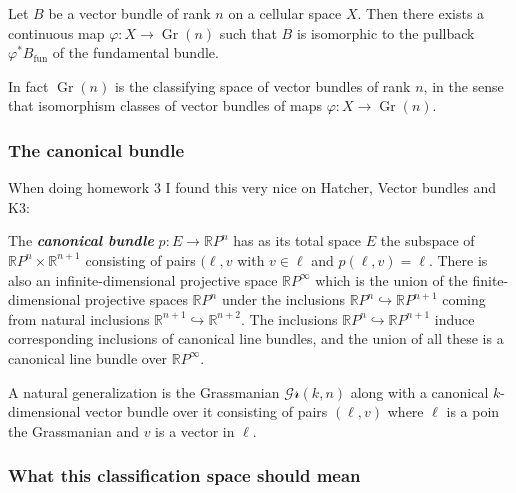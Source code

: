 \begin{thm}\leavevmode
	Let $B$ be a vector bundle of rank $n$ on a cellular space $X$. Then there exists a continuous map $\varphi:X\to \operatorname{Gr}(n)$ such that $ B$ is isomorphic to the pullback $\varphi^*B_{\operatorname{fun}}$ of the fundamental bundle.
\end{thm}

\begin{remark}
	In fact $\operatorname{Gr}(n)$ is the classifying space of vector bundles of rank $n$, in the sense that isomorphism classes of vector bundles of maps $\varphi:X\to \operatorname{Gr}(n)$.
\end{remark}

\subsubsection{The canonical bundle}

When doing homework 3 I found this very nice on Hatcher, Vector bundles and K3:

\begin{defn}
	The \textit{\textbf{canonical bundle}} $p:E\to \mathbb{R}P^{n}$ has as its total space $E$ the subspace of $\mathbb{R}P^{n}\times \mathbb{R}^{n+1}$ consisting of pairs $(\ell,v$ with $v\in\ell$ and $p(\ell,v)=\ell$. There is also an infinite-dimensional projective space $\mathbb{R}P^{\infty}$ which is the union of the finite-dimensional projective spaces $\mathbb{R}P^{n}$ under the inclusions $\mathbb{R}P^{n}\hookrightarrow \mathbb{R}P^{n+1}$ coming from natural inclusions $\mathbb{R}^{n+1}\hookrightarrow \mathbb{R}^{n+2}$. The inclusions $\mathbb{R}P^{n}\hookrightarrow \mathbb{R}P^{n+1}$ induce corresponding inclusions of canonical line bundles, and the union of all these is a canonical line bundle over $\mathbb{R}P^{\infty}$.

	A natural generalization is the Grassmanian $\mathcal{Gr}(k,n)$ along with a canonical $k$-dimensional vector bundle over it consisting of pairs $(\ell,v)$ where $\ell$ is a poin the Grassmanian and  $v$ is a vector in $\ell$.
\end{defn}

\subsubsection{What this classification space should mean}

